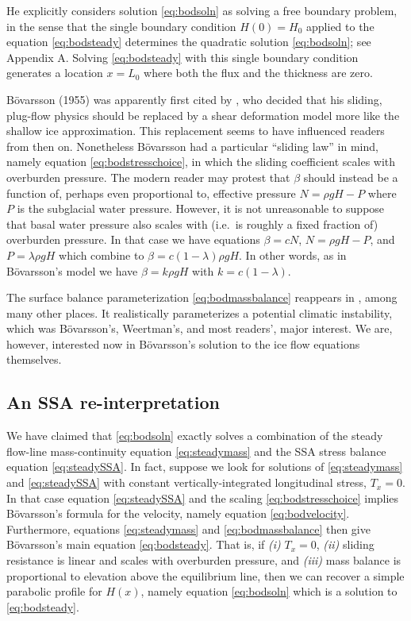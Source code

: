 \documentclass[review,letterpaper]{igs}
\renewcommand{\dh}{\fontencoding{T1}\selectfont{\symbol{240}}}
\newcommand{\bod}{B\"o\dh varsson\xspace}
\newcommand{\citebod}{B\"o\dh varsson (1955)\nocite{Bodvardsson}\xspace}
\begin{document}
He explicitly considers solution \eqref{eq:bodsoln} as solving a free boundary problem, in the sense that the single boundary condition $H(0)=H_0$ applied to the equation \eqref{eq:bodsteady} determines the quadratic solution \eqref{eq:bodsoln}; see Appendix A.  Solving \eqref{eq:bodsteady} with this single boundary condition generates a location $x=L_0$ where both the flux and the thickness are zero.

\citebod was apparently first cited by \cite{Weertman61stability}, who decided that his sliding, plug-flow physics should be replaced by a shear deformation model more like the shallow ice approximation.  This replacement seems to have influenced readers from then on.  Nonetheless \bod had a particular ``sliding law'' in mind, namely equation \eqref{eq:bodstresschoice}, in which the sliding coefficient scales with overburden pressure.  The modern reader may protest that $\beta$ should instead be a function of, perhaps even proportional to, effective pressure $N=\rho g H - P$ where $P$ is the subglacial water pressure.  However, it is not unreasonable to suppose that basal water pressure also scales with (i.e.~is roughly a fixed fraction of) overburden pressure.  In that case we have equations $\beta = c N$, $N=\rho g H - P$, and $P = \lambda \rho g H$ which combine to $\beta = c (1-\lambda) \rho g H$.  In other words, as in \bod's model we have $\beta = k \rho g H$ with $k=c (1-\lambda)$.

The surface balance parameterization \eqref{eq:bodmassbalance} reappears in \cite{Weertman61stability}, among many other places.  It realistically parameterizes a potential climatic instability, which was \bod's, Weertman's, and most readers', major interest.  We are, however, interested now in \bod's solution to the ice flow equations themselves.


\subsection*{An SSA re-interpretation}  We have claimed that \eqref{eq:bodsoln} exactly solves a combination of the steady flow-line mass-continuity equation \eqref{eq:steadymass} and the SSA stress balance equation \eqref{eq:steadySSA}.  In fact, suppose we look for solutions of \eqref{eq:steadymass} and \eqref{eq:steadySSA} with constant vertically-integrated longitudinal stress, $T_x = 0$.  In that case equation \eqref{eq:steadySSA} and the scaling \eqref{eq:bodstresschoice} implies \bod's formula for the velocity, namely equation \eqref{eq:bodvelocity}.  Furthermore, equations \eqref{eq:steadymass} and \eqref{eq:bodmassbalance} then give \bod's main equation \eqref{eq:bodsteady}.  That is, if \emph{(i)} $T_x = 0$, \emph{(ii)} sliding resistance is linear and scales with overburden pressure, and \emph{(iii)} mass balance is proportional to elevation above the equilibrium line, then we can recover a simple parabolic profile for $H(x)$, namely equation \eqref{eq:bodsoln} which is a solution to \eqref{eq:bodsteady}.
\end{document}

